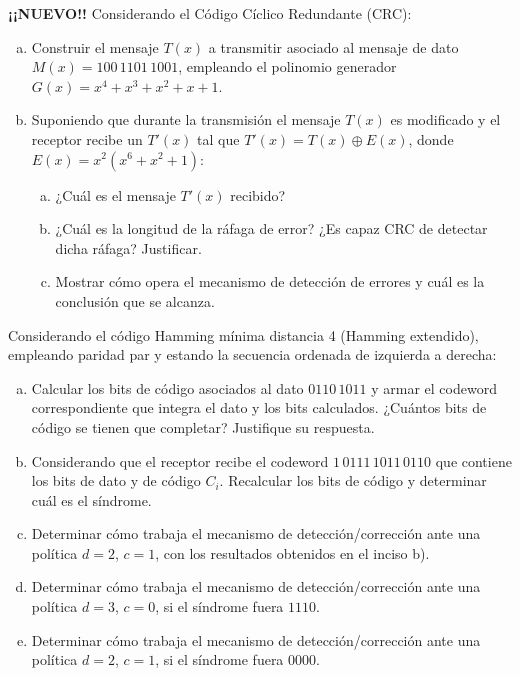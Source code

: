 \documentclass[12pt,a4paper]{article}
\begin{document}
 \textbf{¡¡NUEVO!!} Considerando el Código Cíclico Redundante (CRC):
\begin{enumerate}[a)]
	\item Construir el mensaje $T(x)$ a transmitir asociado al mensaje de dato $M(x) = 100\,1101\,1001$, empleando el polinomio generador $G(x) = x^4 + x^3 + x^2 + x + 1$.

	\item Suponiendo que durante la transmisión el mensaje $T(x)$ es modificado y el receptor recibe un $T'(x)$ tal que $T'(x) = T(x) \oplus E(x)$, donde $E(x) = x^2 (x^6 + x^2 + 1)$:
	\begin{enumerate}[b.1)]
		\item ¿Cuál es el mensaje $T'(x)$ recibido?
		\item ¿Cuál es la longitud de la ráfaga de error? ¿Es capaz CRC de detectar dicha ráfaga? Justificar.
		\item Mostrar cómo opera el mecanismo de detección de errores y cuál es la conclusión que se alcanza.
	\end{enumerate} 
\end{enumerate}

 Considerando el código Hamming mínima distancia 4 (Hamming extendido), empleando paridad par y estando la secuencia ordenada de izquierda a derecha:
\begin{enumerate}[a)]

	\item Calcular los bits de código asociados al dato $0110\,1011$ y armar el codeword correspondiente que integra el dato y los bits calculados. ¿Cuántos bits de código se tienen que completar? Justifique su respuesta. 

	\item Considerando que el receptor recibe el codeword $1\,0111\,1011\,0110$ que contiene los bits de dato y de código $C_i$. Recalcular los bits de código y determinar cuál es el síndrome.

	\item Determinar cómo trabaja el mecanismo de detección/corrección ante una política $d=2$, $c=1$, con los resultados obtenidos en el inciso b).

	\item Determinar cómo trabaja el mecanismo de detección/corrección ante una política $d=3$, $c=0$, si el síndrome fuera $1110$.

	\item Determinar cómo trabaja el mecanismo de detección/corrección ante una política $d=2$, $c=1$, si el síndrome fuera $0000$.

\end{enumerate}
\end{document}
